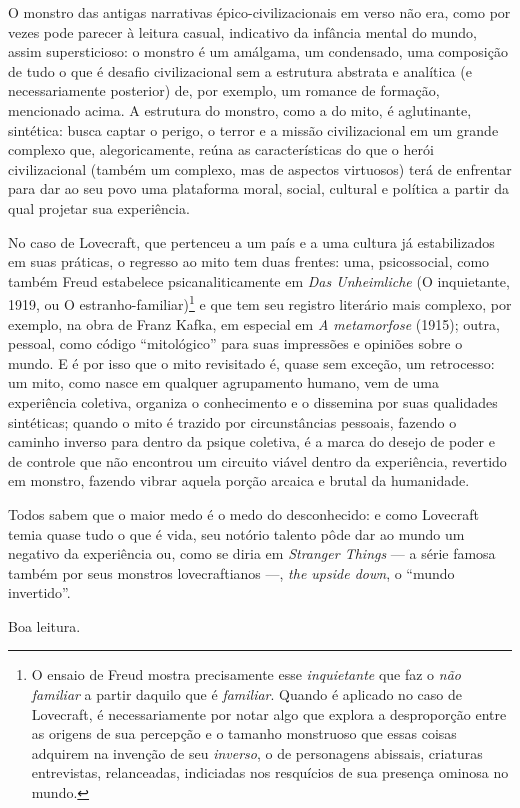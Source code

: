 O monstro das antigas narrativas épico-civilizacionais em verso não era,
como por vezes pode parecer à leitura casual, indicativo da infância
mental do mundo, assim supersticioso: o monstro é um amálgama, um
condensado, uma composição de tudo o que é desafio civilizacional sem a
estrutura abstrata e analítica (e necessariamente posterior) de, por
exemplo, um romance de formação, mencionado acima. A estrutura do
monstro, como a do mito, é aglutinante, sintética: busca captar o
perigo, o terror e a missão civilizacional em um grande complexo que,
alegoricamente, reúna as características do que o herói civilizacional
(também um complexo, mas de aspectos virtuosos) terá de enfrentar para
dar ao seu povo uma plataforma moral, social, cultural e política a
partir da qual projetar sua experiência.

No caso de Lovecraft, que pertenceu a um país e a uma cultura já
estabilizados em suas práticas, o regresso ao mito tem duas frentes:
uma, psicossocial, como também Freud estabelece psicanaliticamente em
\emph{Das Unheimliche} (O inquietante, 1919, ou O
estranho-familiar)\footnote{O ensaio de Freud mostra precisamente esse
  \emph{inquietante} que faz o \emph{não familiar} a partir daquilo que
  é \emph{familiar}. Quando é aplicado no caso de Lovecraft, é
  necessariamente por notar algo que explora a desproporção entre as
  origens de sua percepção e o tamanho monstruoso que essas
  coisas adquirem na invenção de seu \emph{inverso}, o de personagens abissais,
  criaturas entrevistas, relanceadas, indiciadas nos resquícios de sua
  presença ominosa no mundo.} e que tem seu registro literário mais
complexo, por exemplo, na obra de Franz Kafka, em especial em \emph{A metamorfose} (1915); outra, pessoal, como código
``mitológico'' para suas impressões e opiniões sobre o mundo. E é por
isso que o mito revisitado é, quase sem exceção, um retrocesso: um mito,
como nasce em qualquer agrupamento humano, vem de uma experiência
coletiva, organiza o conhecimento e o dissemina por suas qualidades
sintéticas; quando o mito é trazido por circunstâncias pessoais, fazendo
o caminho inverso para dentro da psique coletiva, é a marca do desejo de
poder e de controle que não encontrou um circuito viável dentro da
experiência, revertido em monstro, fazendo vibrar aquela porção arcaica
e brutal da humanidade.

Todos sabem que o maior medo é o medo do desconhecido: e como Lovecraft
temia quase tudo o que é vida, seu notório talento pôde dar ao mundo um
negativo da experiência ou, como se diria em \emph{Stranger Things} ---
a série famosa também por seus monstros lovecraftianos ---, \emph{the
upside down}, o ``mundo invertido''.

Boa leitura.

